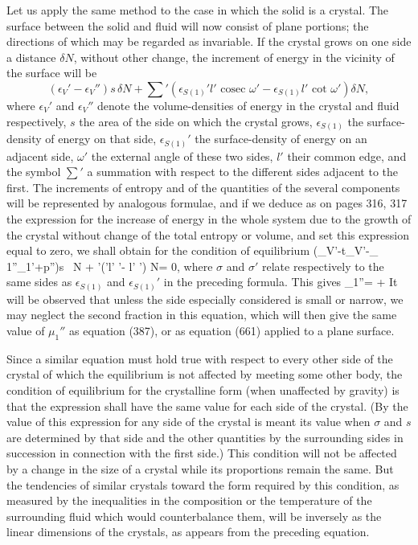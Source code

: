 \documentclass[12pt]{memoir}
\newcommand{\dd}{\delta}
\begin{document}
Let us apply the same method to the case in which the solid is a crystal. The surface between the solid and fluid will now consist of plane portions; the directions of which may be regarded as invariable. If the crystal grows on one side a distance $\dd N$, without other change, the increment of energy in the vicinity of the surface will be
$$(\epsilon_V'- \epsilon_V'')s \, \dd N + \sum\nolimits'(\epsilon_{S(1)}'l' \text{ cosec } \omega'- \epsilon_{S(1)}l' \text{ cot } \omega') \dd N, $$
where $\epsilon_V'$ and $\epsilon_V''$ denote the volume-densities of energy in the crystal and fluid respectively, $s$ the area of the side on which the crystal grows, $\epsilon_{S(1)}$ the surface-density of energy on that side, $\epsilon_{S(1)}'$ the surface-density of energy on an adjacent side, $\omega'$ the external angle of these two sides, $l'$ their common edge, and the symbol $\sum\nolimits'$ a summation with respect to the different sides adjacent to the first. The increments of entropy and of the quantities of the several components will be represented by analogous formulae, and if we deduce as on pages 316, 317 the expression for the increase of energy in the whole system due to the growth of the crystal without change of the total entropy or volume, and set this expression equal to zero, we shall obtain for the condition of equilibrium
\eqs \left(\epsilon_V'-t\eta_V'-\mu_ 1''\gamma_1'+p''\right)s \, \dd N + \sum\nolimits'(\sigma'l'  \omega'- \sigma l'  \omega') \dd N= 0, \label{664}\eqe
where $\sigma$ and $\sigma'$ relate respectively to the same sides as $\epsilon_{S(1)}$ and $\epsilon_{S(1)}'$ in the preceding formula. This gives
\eqs \mu_1''=  +         \label{665}\eqe
It will be observed that unless the side especially considered is small or narrow, we may neglect the second fraction in this equation, which will then give the same value of $\mu_1''$ as equation (387), or as equation (661) applied to a plane surface.

Since a similar equation must hold true with respect to every other side of the crystal of which the equilibrium is not affected by meeting some other body, the condition of equilibrium for the crystalline form (when unaffected by gravity) is that the expression
\eqs {} \label{666}\eqe
shall have the same value for each side of the crystal. (By the value of this expression for any side of the crystal is meant its value when $\sigma$ and $s$ are determined by that side and the other quantities by the surrounding sides in succession in connection with the first side.) This condition will not be affected by a change in the size of a crystal while its proportions remain the same. But the tendencies of similar crystals toward the form required by this condition, as measured by the inequalities in the composition or the temperature of the surrounding fluid which would counterbalance them, will be inversely as the linear dimensions of the crystals, as appears from the preceding equation.
\end{document}
